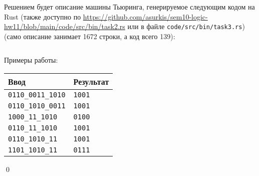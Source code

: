 Решением будет описание машины Тьюринга,
генерируемое следующим кодом на Rust
(также доступно по
\url{https://github.com/asurkis/sem10-logic-hw11/blob/main/code/src/bin/task2.rs}
или в файле \texttt{code/src/bin/task3.rs})
(само описание занимает 1672 строки, а код всего 139):
\inputminted{rust}{code/src/bin/task3.rs}

Примеры работы:

\begin{tabular}{ll}
    Ввод & Результат \\ \hline
    \texttt{0110\_0011\_1010} & \texttt{1001} \\
    \texttt{0110\_1010\_0011} & \texttt{1001} \\
    \texttt{1000\_11\_1010} & \texttt{0100} \\
    \texttt{0110\_11\_1010} & \texttt{1001} \\
    \texttt{0110\_1010\_11} & \texttt{1001} \\
    \texttt{1101\_1010\_11} & \texttt{0111} \\
\end{tabular}

\qed
